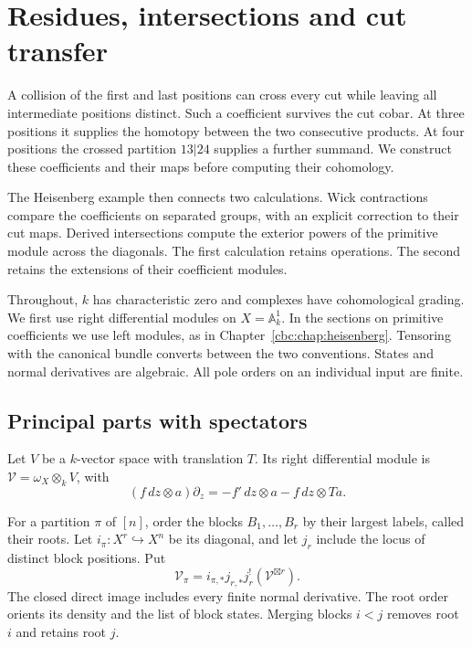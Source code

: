 \chapter{Residues, intersections and cut transfer}
\label{cbc:chap:transfer}

A collision of the first and last positions can cross every cut
while leaving all intermediate positions distinct. Such a coefficient
survives the cut cobar. At three positions it supplies the homotopy
between the two consecutive products. At four positions the crossed
partition $13|24$ supplies a further summand. We construct these
coefficients and their maps before computing their cohomology.

The Heisenberg example then connects two calculations. Wick
contractions compare the coefficients on separated groups, with an
explicit correction to their cut maps. Derived intersections compute
the exterior powers of the primitive module across the diagonals.
The first calculation retains operations. The second retains the
extensions of their coefficient modules.

Throughout, $k$ has characteristic zero and complexes have
cohomological grading. We first use right differential modules on
$X=\mathbb A^1_k$. In the sections on primitive coefficients we
use left modules, as in Chapter~\ref{cbc:chap:heisenberg}. Tensoring
with the canonical bundle converts between the two conventions.
States and normal derivatives are algebraic. All pole orders on
an individual input are finite.

\section{Principal parts with spectators}
\label{cbc:ct:residues}

Let $V$ be a $k$-vector space with translation $T$. Its right
differential module is $\mathscr V=\omega_X\otimes_kV$, with
\[
 (f\,dz\otimes a)\partial_z=-f'\,dz\otimes a-f\,dz\otimes Ta.
\]

For a partition $\pi$ of $[n]$, order the blocks
$B_1,\ldots,B_r$ by their largest labels, called their roots.
Let $i_\pi:X^r\hookrightarrow X^n$ be its diagonal, and let
$j_r$ include the locus of distinct block positions. Put
\begin{equation}\label{cbc:ct:partition}
 \mathcal V_\pi=i_{\pi,*}j_{r,*}j_r^!
                    (\mathscr V^{\boxtimes r}).
\end{equation}
The closed direct image includes every finite normal derivative.
The root order orients its density and the list of block states.
Merging blocks $i<j$ removes root $i$ and retains root $j$.

